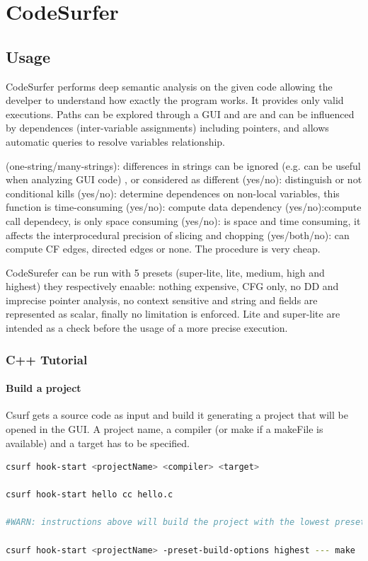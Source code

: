 \chapter{CodeSurfer}

\section{Usage}
CodeSurfer performs deep semantic analysis on the given code allowing the develper to understand how exactly the program works. It provides only valid executions.
Paths can be explored through a GUI and are and can be influenced by dependences (inter-variable assignments) including pointers, and allows automatic queries to resolve variables relationship. \cite{csurfUserGuide2012}

\begin{itemize}
	 (one-string/many-strings): differences in strings can be ignored (e.g. can be useful when analyzing GUI code) , or considered as different 
	 (yes/no): distinguish or not conditional kills 
	(yes/no): determine dependences on non-local variables, this function is time-consuming
	(yes/no): compute data dependency 
	 (yes/no):compute call dependecy, is only space consuming
	(yes/no): is space and time consuming, it affects the interprocedural precision of slicing and chopping
	(yes/both/no): can compute CF edges, directed edges or none. The procedure is very cheap.
\end{itemize}

CodeSurefer can be run with 5 presets (super-lite, lite, medium, high and highest) they respectively enaable: nothing expensive, CFG only, no DD and imprecise pointer analysis, no context sensitive and string and fields are represented as scalar, finally no limitation is enforced. Lite and super-lite are intended as a check before the usage of a more precise execution.

\subsection{C++ Tutorial}
\subsubsection{Build a project}
Csurf gets a source code as input and build it generating a project that will be opened in the GUI. A project name, a compiler (or make if a makeFile is available) and a target has to be specified.
\begin{lstlisting}[language=bash]
csurf hook-start <projectName> <compiler> <target>

csurf hook-start hello cc hello.c

#WARN: instructions above will build the project with the lowest preset which does not allow some kind of analysis! To specify another level (e.g. highest) use command below:

csurf hook-start <projectName> -preset-build-options highest --- make  <target>
\end{lstlisting}

